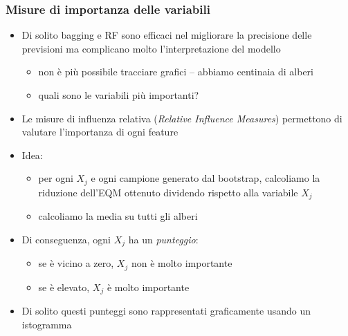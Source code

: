 \begin{frame}
	\frametitle{Misure di importanza delle variabili}
	
	\begin{itemize}
		\item Di solito bagging e RF sono efficaci nel migliorare la precisione delle previsioni ma complicano molto l'interpretazione del modello
			\begin{itemize}
				\item non è più possibile tracciare grafici -- abbiamo centinaia di alberi				
				\item quali sono le variabili più importanti?
			\end{itemize}
		\item Le misure di influenza relativa (\emph{Relative Influence Measures}) permettono di valutare l'importanza di ogni feature
		\item Idea:
			\begin{itemize} 
				\item per ogni $X_j$ e ogni campione generato dal bootstrap, calcoliamo la riduzione dell'EQM ottenuto dividendo rispetto alla variabile $X_j$
				\item calcoliamo la media su tutti gli alberi
			\end{itemize}
		\item Di conseguenza, ogni $X_j$ ha un \emph{punteggio}:
			\begin{itemize}
				\item se è vicino a zero, $X_j$ non è molto importante
				\item se è elevato, $X_j$ è molto importante
			\end{itemize}
		\item Di solito questi punteggi sono rappresentati graficamente usando un istogramma
	\end{itemize}
\end{frame}

